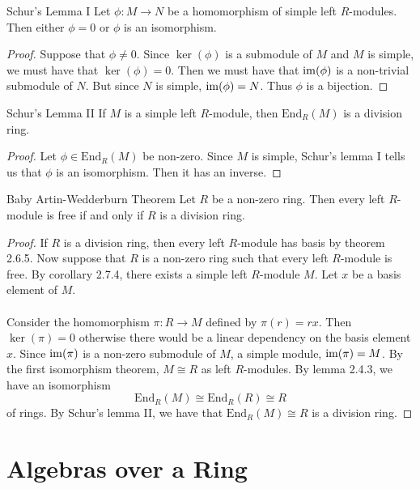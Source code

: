 \documentclass[a4paper]{article}
\begin{document}
\begin{prp}{Schur's Lemma I}{} Let $\phi:M\to N$ be a homomorphism of simple left $R$-modules. Then either $\phi=0$ or $\phi$ is an isomorphism. \tcbline
\begin{proof}
Suppose that $\phi\neq 0$. Since $\ker(\phi)$ is a submodule of $M$ and $M$ is simple, we must have that $\ker(\phi)=0$. Then we must have that $\operatorname{im}(\phi)$ is a non-trivial submodule of $N$. But since $N$ is simple, $\operatorname{im}(\phi)=N$. Thus $\phi$ is a bijection. 
\end{proof}
\end{prp}

\begin{crl}{Schur's Lemma II}{} If $M$ is a simple left $R$-module, then $\text{End}_R(M)$ is a division ring. \tcbline
\begin{proof}
Let $\phi\in\text{End}_R(M)$ be non-zero. Since $M$ is simple, Schur's lemma I tells us that $\phi$ is an isomorphism. Then it has an inverse. 
\end{proof}
\end{crl}

\begin{thm}{Baby Artin-Wedderburn Theorem}{} Let $R$ be a non-zero ring. Then every left $R$-module is free if and only if $R$ is a division ring. \tcbline
\begin{proof}
If $R$ is a division ring, then every left $R$-module has basis by theorem 2.6.5. Now suppose that $R$ is a non-zero ring such that every left $R$-module is free. By corollary 2.7.4, there exists a simple left $R$-module $M$. Let $x$ be a basis element of $M$. \\~\\

Consider the homomorphism $\pi:R\to M$ defined by $\pi(r)=rx$. Then $\ker(\pi)=0$ otherwise there would be a linear dependency on the basis element $x$. Since $\operatorname{im}(\pi)$ is a non-zero submodule of $M$, a simple module, $\operatorname{im}(\pi)=M$. By the first isomorphism theorem, $M\cong R$ as left $R$-modules. By lemma 2.4.3, we have an isomorphism $$\text{End}_R(M)\cong\text{End}_R(R)\cong R$$ of rings. By Schur's lemma II, we have that $\text{End}_R(M)\cong R$ is a division ring. 
\end{proof}
\end{thm}

\pagebreak
\section{Algebras over a Ring}
\end{document}
